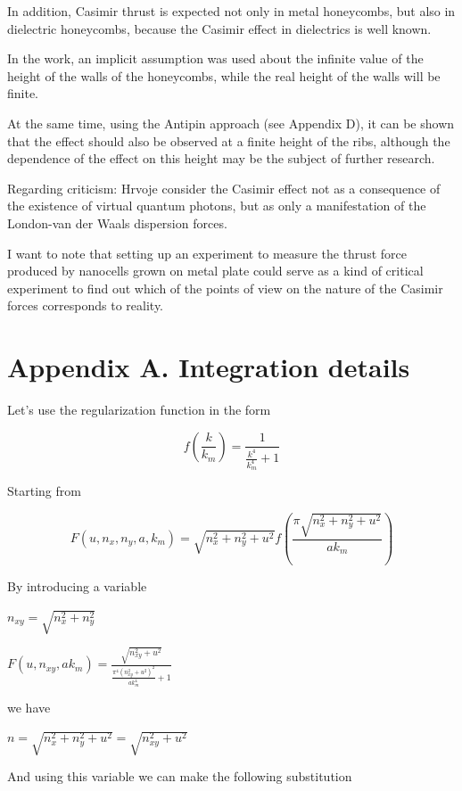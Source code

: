 \documentclass[11pt]{article}
\begin{document}
    In addition, Casimir thrust is expected not only in metal honeycombs,
but also in dielectric honeycombs, because the Casimir effect in dielectrics
is well known.

    In the work, an implicit assumption was used about the infinite value of
the height of the walls of the honeycombs, while the real height of the
walls will be finite.

    At the same time, using the Antipin approach (see Appendix D), it can be
shown that the effect should also be observed at a finite height of the
ribs, although the dependence of the effect on this height may be the
subject of further research.

    Regarding criticism: Hrvoje \cite{Hrvoje2016} consider the Casimir
effect not as a consequence of the existence of virtual quantum photons,
but as only a manifestation of the London-van der Waals dispersion
forces.

    I want to note that setting up an experiment to measure the thrust force
produced by nanocells grown on metal plate could serve as a kind of critical
experiment to find out which of the points of view on the nature of the
Casimir forces corresponds to reality.

    \section{Appendix A. Integration details}\label{appendix-a.-integration-details}

    Let's use the regularization function in the form

    \[f\left(\frac{k}{k_m}\right) = \frac{1}{\frac{k^{4}}{k_{m}^{4}} + 1}\]

    Starting from

    \[F\left(u, n_x, n_y, a, k_m\right) = \sqrt{n_{x}^{2} + n_{y}^{2} + u^{2}} f\left(\frac{\pi \sqrt{n_{x}^{2} + n_{y}^{2} + u^{2}}}{a k_{m}}\right)\]

    By introducing a variable

\(n_{xy} = \sqrt{n_x^2 + n_y^2}\)

    \(F\left(u, n_{xy}, ak_m\right) = \frac{\sqrt{n_{\mathit{xy}}^{2} + u^{2}}}{\frac{\pi^{4} {\left(n_{\mathit{xy}}^{2} + u^{2}\right)}^{2}}{\mathit{ak}_{m}^{4}} + 1}\)

    we have

\(n = \sqrt{n_x^2 + n_y^2 + u^2} = \sqrt{n_{xy}^2 + u^2}\)

And using this variable we can make the following substitution
\end{document}
